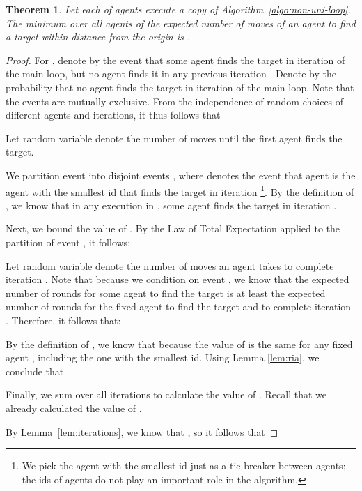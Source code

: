 \documentclass[11pt]{article}
\newtheorem{theorem}{Theorem}[section]
\begin{document}
\begin{theorem}
\label{thm:upper}
Let each of  agents execute a copy of Algorithm~\ref{algo:non-uni-loop}. The minimum over all agents of the expected number of moves of an agent to find a target within distance  from the origin is .
\end{theorem}
\begin{proof}
For , denote by  the event that some agent finds the target in iteration  of the main loop, but no agent finds it in any previous iteration . 
Denote by  the probability that no agent finds the target in iteration  of the main loop. 
Note that the events  are mutually exclusive. From the independence of random choices of different agents and iterations, it thus follows that


Let random variable  denote the number of moves until the first agent finds the target.


We partition event  into disjoint events , where  denotes the event that agent  is the agent with the smallest id that finds the target in iteration \footnote{We pick the agent with the smallest id just as a tie-breaker between agents; the ids of agents do not play an important role in the algorithm.}. By the definition of , we know that in any execution in , some agent finds the target in iteration .

Next, we bound the value of . By the Law of Total Expectation applied to the partition of event , it follows:



Let random variable  denote the number of moves an agent  takes to complete iteration . Note that because we condition on event , we know that the expected number of rounds for some agent to find the target is at least the expected number of rounds for the fixed agent  to find the target and to complete iteration . Therefore, it follows that: 



By the definition of , we know that  because the value of  is the same for any fixed agent , including the one with the smallest id. Using Lemma \ref{lem:ria}, we conclude that



Finally, we sum over all iterations to calculate the value of . Recall that we already calculated the value of .

By Lemma~\ref{lem:iterations}, we know that , so it follows that

\end{proof}
\end{document}
